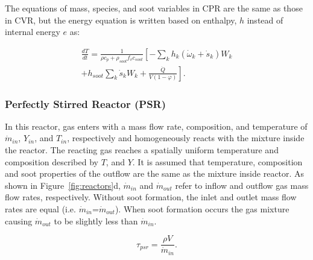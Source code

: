 

The equations of mass, species, and soot variables in CPR are the same as those in CVR, but the energy equation is written based on enthalpy, $h$ instead of internal energy $e$ as:

\begin{equation}
	\begin{split}
		\frac{d T}{d t}=
		\frac{1}{\rho c_p+\rho_{soot}f_v c_{soot}}
		\left[
		-\sum_k h_k
		\left(
		\dot{\omega}_k+\dot{s}_k
		\right) W_k \right. \\
		\left.
		+h_{soot}\sum_k \dot{s}_k W_k
		+\frac{\dot{Q}}{V(1-\varphi)}
		\right]
		\label{eqn:energypressure}.
	\end{split}
\end{equation}

\subsubsection{Perfectly Stirred Reactor (PSR)}
In this reactor, gas enters with a mass flow rate, composition, and temperature of $\dot{m}_{in}$, $Y_{in}$, and $T_{in}$, respectively and homogeneously reacts with the mixture inside the reactor. The reacting gas reaches a spatially uniform temperature and composition described by $T$, and $Y$. It is assumed that temperature, composition and soot properties of the outflow are the same as the mixture inside reactor. As shown in Figure~\ref{fig:reactors}d, ${\dot{m}_{in}}$ and ${\dot{m}_{out}}$ refer to inflow and outflow gas mass flow rates, respectively. Without soot formation, the inlet and outlet mass flow rates are equal (i.e. ${\dot{m}_{in}}$=${\dot{m}_{out}}$). When soot formation occurs the gas mixture causing ${\dot{m}_{out}}$ to be slightly less than ${\dot{m}_{in}}$.

\begin{equation}
	\tau_{psr} = \frac{\rho V}{\dot{m}_{in}}
	\label{eqn:taupsr}.
\end{equation} 


